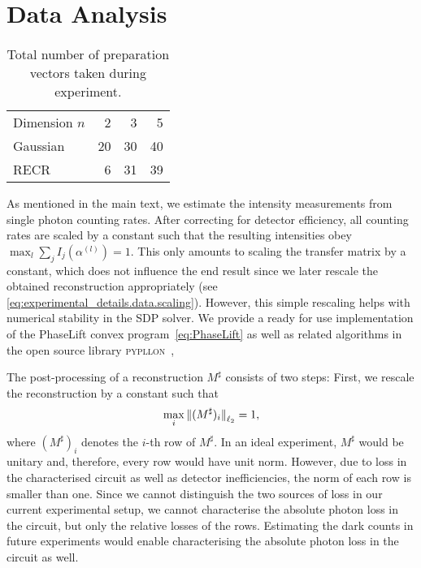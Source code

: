 \section{Data Analysis}%
\label{sub:experimental_details.data}

\begin{table}
  \begin{tabular}{l | r r r}
    Dimension $n$ & 2 & 3 & 5 \\
    Gaussian & 20 & 30 & 40 \\
    RECR & 6 & 31 & 39 \\
  \end{tabular}
  \caption{%
    \label{tab:measurements}
    Total number of preparation vectors taken during experiment.
  }
\end{table}

As mentioned in the main text, we estimate the intensity measurements from single photon counting rates.
After correcting for detector efficiency, all counting rates are scaled by a constant such that the resulting intensities obey $\max_l \sum_j I_j(\alpha^{(l)}) = 1$.
This only amounts to scaling the transfer matrix by a constant, which does not influence the end result since we later rescale the obtained reconstruction appropriately (see \cref{eq:experimental_details.data.scaling}).
However, this simple rescaling helps with numerical stability in the SDP solver.
We provide a ready for use implementation of the PhaseLift convex program~\eqref{eq:PhaseLift} as well as related algorithms in the open source library \textsc{pypllon}~\cite{Suess_2017_Pypllon},

The post-processing of a reconstruction ${M}^\sharp$ consists of two steps:
First, we rescale the reconstruction by a constant such that
\[
  \label{eq:experimental_details.data.scaling}
  \max_i {\Vert(M^\sharp)_i\Vert}_{\ell_2} = 1,
\]
where $(M^\sharp)_i$ denotes the $i$-th row of $M^\sharp$.
In an ideal experiment, $M^\sharp$ would be unitary and, therefore, every row would have unit norm.
However, due to loss in the characterised circuit as well as detector inefficiencies, the norm of each row is smaller than one.
Since we cannot distinguish the two sources of loss in our current experimental setup, we cannot characterise the absolute photon loss in the circuit, but only the relative losses of the rows.
Estimating the dark counts in future experiments would enable characterising the absolute photon loss in the circuit as well.

